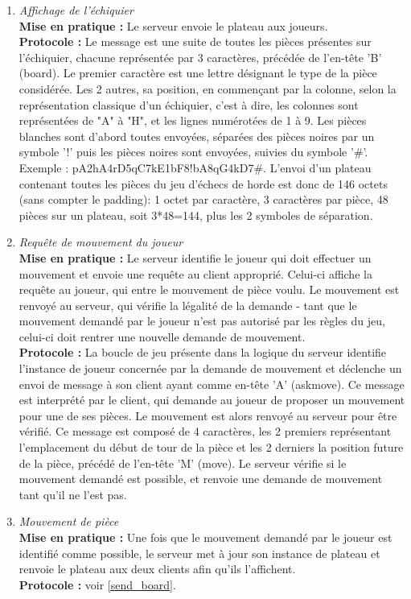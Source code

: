 \documentclass[10pt, a4paper]{article}
\begin{document}
\begin{enumerate}
\item \textit{Affichage de l'échiquier} \\
\textbf{Mise en pratique :} Le serveur envoie le plateau aux joueurs. \\
\textbf{Protocole :} Le message est une suite de toutes les pièces présentes sur l'échiquier, chacune représentée par 3 caractères, précédée de l'en-tête 'B' (board). Le premier caractère est une lettre désignant le type de la pièce considérée. Les 2 autres, sa position, en commençant par la colonne, selon la représentation classique d'un échiquier, c'est à dire, les colonnes sont représentées de "A" à "H", et les lignes numérotées de 1 à 9. Les pièces blanches sont d'abord toutes envoyées, séparées des pièces noires par un symbole '!' puis les pièces noires sont envoyées, suivies du symbole '\#'. Exemple : pA2hA4rD5qC7kE1bF8!bA8qG4kD7\#. L'envoi d'un plateau contenant toutes les pièces du jeu d'échecs de horde est donc de 146 octets (sans compter le padding): 1 octet par caractère, 3 caractères par pièce, 48 pièces sur un plateau, soit 3*48=144, plus les 2 symboles de séparation.
\label{send_board}

\item \textit{Requête de mouvement du joueur} \\
\textbf{Mise en pratique :} Le serveur identifie le joueur qui doit effectuer un mouvement et envoie une requête au client approprié. Celui-ci affiche la requête au joueur, qui entre le mouvement de pièce voulu. Le mouvement est renvoyé au serveur, qui vérifie la légalité de la demande - tant que le mouvement demandé par le joueur n'est pas autorisé par les règles du jeu, celui-ci doit rentrer une nouvelle demande de mouvement.\\
\textbf{Protocole :} La boucle de jeu présente dans la logique du serveur identifie l'instance de joueur concernée par la demande de mouvement et déclenche un envoi de message à son client ayant comme en-tête 'A' (askmove). Ce message est interprété par le client, qui demande au joueur de proposer un mouvement pour une de ses pièces. Le mouvement est alors renvoyé au serveur pour être vérifié. Ce message est composé de 4 caractères, les 2 premiers représentant l'emplacement du début de tour de la pièce et les 2 derniers la position future de la pièce, précédé de l'en-tête 'M' (move). Le serveur vérifie si le mouvement demandé est possible, et renvoie une demande de mouvement tant qu'il ne l'est pas.

\item \textit{Mouvement de pièce} \\
\textbf{Mise en pratique :} Une fois que le mouvement demandé par le joueur est identifié comme possible, le serveur met à jour son instance de plateau et renvoie le plateau aux deux clients afin qu'ils l'affichent.  \\
\textbf{Protocole :} voir \ref{send_board}.


\end{enumerate}
\end{document}
